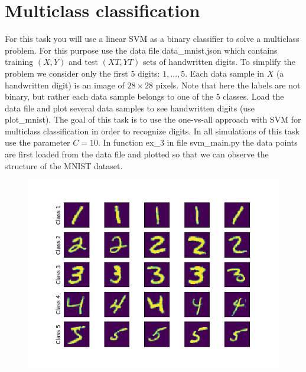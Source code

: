 \documentclass[a4paper]{article}
\begin{document}
\newpage
\section{Multiclass classification}
For this task you will use a linear SVM as a binary classifier to solve a multiclass problem. For this purpose use the data file data\_mnist.json which contains training $(X, Y )$ and test $(XT, Y T)$ sets of handwritten digits. To simplify the problem we consider only the first $5$ digits: $1, . . . , 5$. Each data sample in $X$ (a handwritten digit) is an image of $28 \times 28$ pixels. Note that here the labels are not binary, but rather each data sample belongs to one of the $5$ classes. Load the data file and plot several data samples to see handwritten digits (use plot\_mnist). The goal of this task is to use the one-vs-all approach with SVM for multiclass classification in order to recognize digits. In all simulations of this task use the parameter $C = 10$. 
In function ex\_3 in file svm\_main.py the data points are first loaded from the data file and plotted so that we can observe the structure of the MNIST dataset.

\begin{figure}[htp]
\centering
  \includegraphics[scale=0.38]{plots/ex3.png}
  \label{fig:14}
\end{figure}
\end{document}
